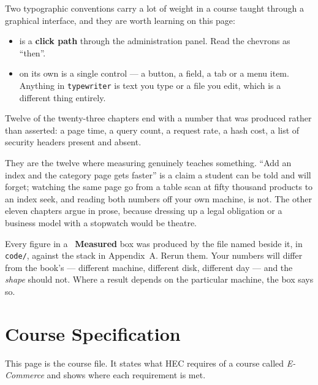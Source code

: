 Two typographic conventions carry a lot of weight in a course taught through a
graphical interface, and they are worth learning on this page:

\begin{itemize}[leftmargin=1.6em, itemsep=3pt, topsep=4pt]
  \item {} is a \textbf{click path} through
        the administration panel. Read the chevrons as ``then''.
  \item {} on its own is a single control --- a button, a field, a tab
        or a menu item. Anything in \texttt{typewriter} is text you type or a
        file you edit, which is a different thing entirely.
\end{itemize}

\begin{alertbox}
Twelve of the twenty-three chapters end with a number that was produced rather
than asserted: a page time, a query count, a request rate, a hash cost, a list
of security headers present and absent.

\smallskip
They are the twelve where measuring genuinely teaches something. ``Add an index
and the category page gets faster'' is a claim a student can be told and will
forget; watching the same page go from a table scan at fifty thousand products
to an index seek, and reading both numbers off your own machine, is not. The
other eleven chapters argue in prose, because dressing up a legal obligation or
a business model with a stopwatch would be theatre.

\smallskip
Every figure in a ~\textbf{Measured} box was produced by
the file named beside it, in \texttt{code/}, against the stack in Appendix~A.
Rerun them. Your numbers will differ from the book's --- different machine,
different disk, different day --- and the \emph{shape} should not. Where a
result depends on the particular machine, the box says so.
\end{alertbox}

\newpage

\chapter*{Course Specification}

This page is the course file. It states what HEC requires of a course called
\emph{E-Commerce} and shows where each requirement is met.

